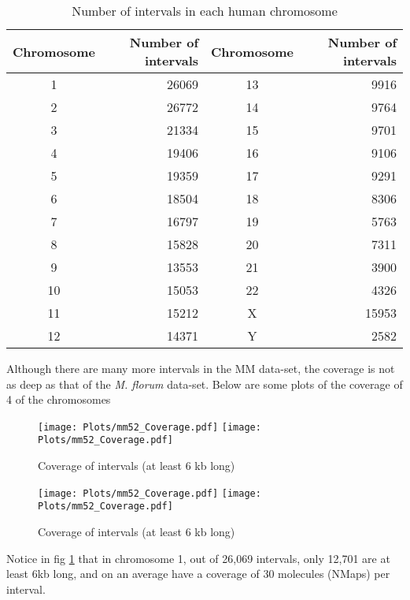 \begin{table}[H]
\centering
\begin{tabular}{c | r || c | r}
  \hline
  \hline
  Chromosome & Number of intervals & Chromosome & Number of intervals \\ 
  \hline
  1 & 26069  & 13 & 9916 \\
  2 & 26772  & 14 & 9764 \\
  3 & 21334  & 15 & 9701 \\
  4 & 19406  & 16 & 9106 \\
  5 & 19359  & 17 & 9291 \\
  6 & 18504  & 18 & 8306 \\
  7 & 16797  & 19 & 5763 \\
  8 & 15828  & 20 & 7311 \\
  9 & 13553  & 21 & 3900 \\
  10 & 15053  & 22 & 4326 \\
  11 & 15212  & X & 15953 \\
  12 & 14371  & Y & 2582 \\
  \hline
  \hline
\end{tabular}
\caption{Number of intervals in each human chromosome}
\label{tab:mm52intervals}
\end{table}
Although there are many more intervals in the MM data-set, the coverage is not as deep as that of the {\emph{M. florum}} data-set. Below are some plots of the coverage of 4 of the chromosomes
\begin{figure}[H]
\begin{center}
\texttt{[image: Plots/mm52\_Coverage.pdf]}
\texttt{[image: Plots/mm52\_Coverage.pdf]}
\end{center}
\caption{Coverage of intervals (at least 6 kb long)}
\label{fig:Coverage_mm1}
\end{figure}

\begin{figure}[H]
\begin{center}
\texttt{[image: Plots/mm52\_Coverage.pdf]}
\texttt{[image: Plots/mm52\_Coverage.pdf]}
\end{center}
\caption{Coverage of intervals (at least 6 kb long)}
\label{fig:Coverage_mm2}
\end{figure}

Notice in fig \ref{fig:Coverage_mm1} that in chromosome 1, out of 26,069 intervals, only 12,701 are at least 6kb long, and on an average have a coverage of 30 molecules (NMaps) per interval.

